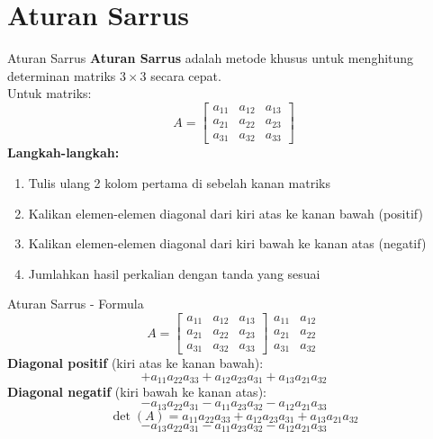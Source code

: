 \documentclass{beamer}
\begin{document}
\section{Aturan Sarrus}
\begin{frame}[t,fragile]{Aturan Sarrus}
\textbf{Aturan Sarrus} adalah metode khusus untuk menghitung determinan matriks $3 \times 3$ secara cepat.\\
\vspace{0.3cm}
Untuk matriks:
$$ A = \begin{bmatrix}
       	a_{11} & a_{12} & a_{13} \\
	    a_{21} & a_{22} & a_{23} \\
	    a_{31} & a_{32} & a_{33}
        \end{bmatrix} $$
\textbf{Langkah-langkah:}
\begin{enumerate}
\item Tulis ulang 2 kolom pertama di sebelah kanan matriks
\item Kalikan elemen-elemen diagonal dari kiri atas ke kanan bawah (positif)
\item Kalikan elemen-elemen diagonal dari kiri bawah ke kanan atas (negatif)
\item Jumlahkan hasil perkalian dengan tanda yang sesuai
\end{enumerate}
\end{frame}

\begin{frame}[t,fragile]{Aturan Sarrus - Formula}
$$ A = \begin{bmatrix}
       	a_{11} & a_{12} & a_{13} \\
	    a_{21} & a_{22} & a_{23} \\
	    a_{31} & a_{32} & a_{33}
        \end{bmatrix} 
        \begin{matrix}
       	a_{11} & a_{12} \\
	    a_{21} & a_{22} \\
	    a_{31} & a_{32}
        \end{matrix} $$
\vspace{0.3cm}
\textbf{Diagonal positif} (kiri atas ke kanan bawah):
$$ +a_{11}a_{22}a_{33} + a_{12}a_{23}a_{31} + a_{13}a_{21}a_{32} $$
\textbf{Diagonal negatif} (kiri bawah ke kanan atas):
$$ -a_{13}a_{22}a_{31} - a_{11}a_{23}a_{32} - a_{12}a_{21}a_{33} $$
\vspace{0.2cm}
$$ \det(A) = a_{11}a_{22}a_{33} + a_{12}a_{23}a_{31} + a_{13}a_{21}a_{32} $$
$$ - a_{13}a_{22}a_{31} - a_{11}a_{23}a_{32} - a_{12}a_{21}a_{33} $$
\end{frame}
\end{document}
